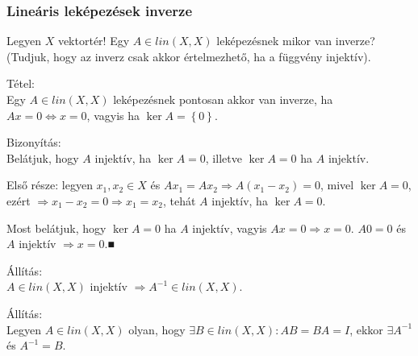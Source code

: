 \documentclass[12pt,a4paper]{scrartcl}
\newenvironment{tetel}{}{}
\newenvironment{bizonyitas}{}{}
\newenvironment{allitas}{}{}
\begin{document}
\hypertarget{linearis-lekepezesek-inverze}{%
\subsubsection{Lineáris leképezések
inverze}\label{linearis-lekepezesek-inverze}}

Legyen \(X\) vektortér! Egy \(A \in {lin}\left( {X,X} \right)\)
leképezésnek mikor van inverze? (Tudjuk, hogy az inverz csak akkor
értelmezhető, ha a függvény injektív).

\begin{tetel}

Tétel:\\
Egy \(A \in {lin}\left( {X,X} \right)\) leképezésnek pontosan akkor van
inverze, ha \(\left. Ax = 0\Leftrightarrow x = 0 \right.\), vagyis ha
\(\ker A = \left\{ 0 \right\}\).

\end{tetel}

\begin{bizonyitas}

Bizonyítás:\\
Belátjuk, hogy \(A\) injektív, ha \(\ker A = 0\), illetve \(\ker A = 0\)
ha \(A\) injektív.

Első része: legyen \(x_{1},x_{2} \in X\) és
\(\left. Ax_{1} = Ax_{2}\Rightarrow A\left( {x_{1} - x_{2}} \right) = 0 \right.\),
mivel \(\ker A = 0\), ezért
\(\left. \Rightarrow x_{1} - x_{2} = 0\Rightarrow x_{1} = x_{2} \right.\),
tehát \(A\) injektív, ha \(\ker A = 0\).

Most belátjuk, hogy \(\ker A = 0\) ha \(A\) injektív, vagyis
\(\left. Ax = 0\Rightarrow x = 0 \right.\). \(A0 = 0\) és \(A\) injektív
\(\left. \Rightarrow x = 0 \right.\).■

\end{bizonyitas}

\begin{allitas}

Állítás:\\
\(A \in {lin}\left( {X,X} \right)\) injektív
\(\left. \Rightarrow A^{- 1} \in {lin}\left( {X,X} \right) \right.\).

\end{allitas}

\begin{allitas}

Állítás:\\
Legyen \(A \in {lin}\left( {X,X} \right)\) olyan, hogy
\(\exists B \in {lin}\left( {X,X} \right):AB = BA = I\), ekkor
\(\exists A^{- 1}\) és \(A^{- 1} = B\).

\end{allitas}
\end{document}
